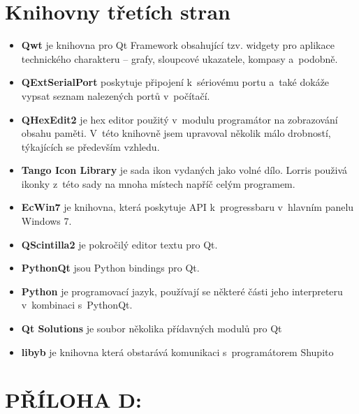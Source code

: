 \documentclass[12pt, a4paper, oneside]{article}
\begin{document}
\section*{Knihovny třetích stran}
\begin{itemize}
    \item {\bf Qwt}\cite{qwt} je knihovna pro Qt Framework obsahující tzv. widgety pro aplikace technického charakteru -- grafy, sloupcové ukazatele, kompasy a~podobně.
    \item {\bf QExtSerialPort}\cite{qext} poskytuje připojení k~sériovému portu a~také dokáže vypsat seznam nalezených portů v~počítačí.
    \item {\bf QHexEdit2}\cite{qhex} je hex editor použitý v~modulu programátor na zobrazování obsahu paměti. V~této knihovně jsem upravoval několik málo drobností, týkajících se především vzhledu.
    \item {\bf Tango Icon Library}\cite{tango} je sada ikon vydaných jako volné dílo. Lorris použivá ikonky z~této sady na mnoha místech napříč celým programem.
    \item {\bf EcWin7}\cite{ecwin7} je knihovna, která poskytuje API k~progressbaru v~hlavním panelu Windows 7.
    \item {\bf QScintilla2}\cite{qsci} je pokročilý editor textu pro Qt.
    \item {\bf PythonQt}\cite{pythonqt} jsou Python bindings pro Qt.
    \item {\bf Python}\cite{python} je programovací jazyk, používají se některé části jeho interpreteru v~kombinaci s~PythonQt.
    \item {\bf Qt Solutions}\cite{qtsolutions} je soubor několika přídavných modulů pro Qt
    \item {\bf libyb}\cite{libyb} je knihovna která obstarává komunikaci s~programátorem Shupito
\end{itemize}

\section*{PŘÍLOHA D:}
\end{document}
